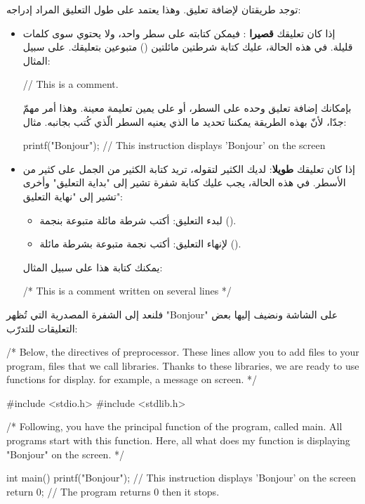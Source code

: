 توجد طريقتان لإضافة تعليق. وهذا يعتمد على طول التعليق المراد إدراجه:

\begin{itemize}
  \item إذا كان تعليقك
\textbf{قصيرا}
: فيمكن كتابته على سطر واحد، ولا يحتوي سوى كلمات قليلة. في هذه الحالة، عليك كتابة شرطتين مائلتين
(\InlineCode{//})
متبوعين بتعليقك. على سبيل المثال:

\begin{Csource}
// This is a comment.
\end{Csource}

بإمكانك إضافة تعليق وحده على السطر، أو على يمين تعليمة معينة. وهذا أمر مهمّ جدّا، لأنّ بهذه الطريقة يمكننا تحديد ما الذي يعنيه السطر الّذي كُتب بجانبه. مثال:

\begin{Csource}
printf("Bonjour"); // This instruction displays 'Bonjour' on the screen
\end{Csource}

  \item  إذا كان تعليقك
\textbf{طويلا}:
لديك الكثير لتقوله، تريد كتابة الكثير من الجمل على كثير من الأسطر. في هذه الحالة، يجب عليك كتابة شفرة تشير إلى "بداية التعليق" وأخرى تشير إلى "نهاية التعليق":

  \begin{itemize}
    \item لبدء التعليق: أكتب شرطة مائلة متبوعة بنجمة 
    (\InlineCode{/*}).
    \item لإنهاء التعليق: أكتب نجمة متبوعة بشرطة مائلة 
    (\InlineCode{*/}).
  \end{itemize}

  يمكنك كتابة هذا على سبيل المثال:
  
  \begin{Csource}
/* This is
a comment
written on several lines */
  \end{Csource}
\end{itemize}
فلنعد إلى الشفرة المصدرية التي تُظهر
"\textenglish{Bonjour}"
على الشاشة ونضيف إليها بعض التعليقات للتدرّب:

\begin{Csource}
/*
Below, the directives of preprocessor.
These lines allow you to add files to your program,
files that we call libraries. Thanks to these libraries, we are ready to use functions for display.
for example, a message on screen.
*/

#include <stdio.h>
#include <stdlib.h>

/*
Following, you have the principal function of the program, called main.
All programs start with this function.
Here, all what does my function is displaying "Bonjour" on the screen.
*/

int main()
{
  printf("Bonjour"); // This instruction displays 'Bonjour' on the screen
  return 0;          // The program returns 0 then it stops.
}
\end{Csource}

